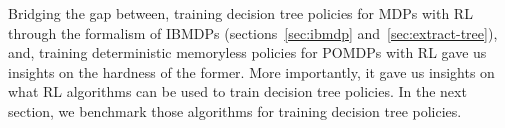 Bridging the gap between, training decision tree policies for MDPs with RL through the formalism of IBMDPs (sections~\ref{sec:ibmdp} and~\ref{sec:extract-tree}), and, training deterministic memoryless policies for POMDPs with RL gave us insights on the hardness of the former.
More importantly, it gave us insights on what RL algorithms can be used to train decision tree policies.
In the next section, we benchmark those algorithms for training decision tree policies.